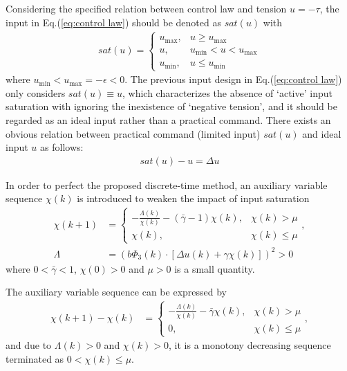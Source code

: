 \documentclass[10pt,final,journal]{IEEEtran}
\begin{document}
Considering the specified relation between control law and tension $u=-\tau$, the input in Eq.(\ref{eq:control law}) should be denoted as $sat(u)$ with
\begin{align}
	sat(u)=\left\{
             \begin{array}{ll}
             u_{\max}, &u\ge u_{\max}  \\
             u, & u_{\min}<u<u_{\max}\\
             u_{\min}, &u\le u_{\min}
             \end{array}
\right.
\end{align}
where $u_{\min}<u_{\max}=-\epsilon<0$. The previous input design in Eq.(\ref{eq:control law}) only considers $sat(u)\equiv u$, which characterizes the absence of `active' input saturation with ignoring the inexistence of `negative tension', and it should be regarded as an ideal input rather than a practical command. There exists an obvious relation between practical command (limited input) $sat(u)$ and ideal input $u$ as follows:
\begin{align}
	sat(u)-u = \Delta u
\end{align}

In order to perfect the proposed discrete-time method, an auxiliary variable sequence $\chi(k)$ is introduced to weaken the impact of input saturation
\begin{align}\label{eq:chi}
	\chi(k+1)&=\left\{
             \begin{array}{ll}
             -\frac{\Lambda(k)}{\chi(k)}-(\bar\gamma-1)\chi(k), &\chi(k)>\mu   \\
             \chi(k), & \chi(k)\le \mu
             \end{array},
\right.\\
\Lambda &=\left(b\Phi_3(k)\cdot\left[\Delta u(k)+\gamma\chi(k)\right]\right)^2>0
\end{align}
where $0<\bar\gamma<1$, $\chi(0)>0$ and $\mu>0$ is a small quantity. 

The auxiliary variable sequence can be expressed by 
\begin{align}
	\chi(k+1)-\chi(k)&=\left\{
             \begin{array}{ll}
             -\frac{\Lambda(k)}{\chi(k)}-\bar\gamma\chi(k), &\chi(k)>\mu   \\
             0, & \chi(k)\le \mu
             \end{array},
\right.
\end{align}
and due to $\Lambda(k)>0$ and $\chi(k)>0$, it is a monotony decreasing sequence terminated as $0<\chi(k)\le\mu$. 
\end{document}
